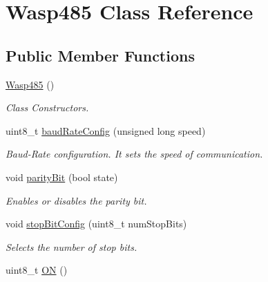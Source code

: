 \hypertarget{class_wasp485}{}\section{Wasp485 Class Reference}
\label{class_wasp485}
\subsection*{Public Member Functions}
\begin{DoxyCompactItemize}
\item 
\hyperlink{class_wasp485_a54ab3087d6f21a921c2c043af1f032cc}{Wasp485} ()\hypertarget{class_wasp485_a54ab3087d6f21a921c2c043af1f032cc}{}\label{class_wasp485_a54ab3087d6f21a921c2c043af1f032cc}

\begin{DoxyCompactList}\small\item\em Class Constructors. \end{DoxyCompactList}\item 
uint8\+\_\+t \hyperlink{class_wasp485_a3a4184c9cb1581ab15f1d901db431d61}{baud\+Rate\+Config} (unsigned long speed)
\begin{DoxyCompactList}\small\item\em Baud-\/\+Rate configuration. It sets the speed of communication. \end{DoxyCompactList}\item 
void \hyperlink{class_wasp485_ae23e0121dba6592a281c21e0d942e017}{parity\+Bit} (bool state)\hypertarget{class_wasp485_ae23e0121dba6592a281c21e0d942e017}{}\label{class_wasp485_ae23e0121dba6592a281c21e0d942e017}

\begin{DoxyCompactList}\small\item\em Enables or disables the parity bit. \end{DoxyCompactList}\item 
void \hyperlink{class_wasp485_a9af731502e207f5cd999c7641aaab602}{stop\+Bit\+Config} (uint8\+\_\+t num\+Stop\+Bits)\hypertarget{class_wasp485_a9af731502e207f5cd999c7641aaab602}{}\label{class_wasp485_a9af731502e207f5cd999c7641aaab602}

\begin{DoxyCompactList}\small\item\em Selects the number of stop bits. \end{DoxyCompactList}\item 
uint8\+\_\+t \hyperlink{class_wasp485_aa96e887d45496117867483221d48c972}{ON} ()\hypertarget{class_wasp485_aa96e887d45496117867483221d48c972}{}\label{class_wasp485_aa96e887d45496117867483221d48c972}


\end{DoxyCompactItemize}
